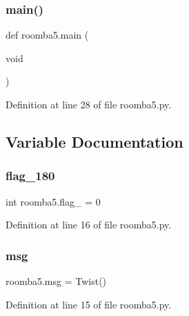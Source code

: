\subsubsection{\texorpdfstring{main()}{main()}}
{\footnotesize\ttfamily def roomba5.\+main (\begin{DoxyParamCaption}\item[{void}]{ }\end{DoxyParamCaption})}



Definition at line 28 of file roomba5.\+py.



\subsection{Variable Documentation}
\mbox{\label{namespaceroomba5_ac8bb0244cccd2213d5c04a634a0760e7}} 
\subsubsection{\texorpdfstring{flag\_180}{flag\_180}}
{\footnotesize\ttfamily int roomba5.\+flag\+\_ = 0}



Definition at line 16 of file roomba5.\+py.

\mbox{\label{namespaceroomba5_abac30f38a065446691c5ab88937ed237}} 
\subsubsection{\texorpdfstring{msg}{msg}}
{\footnotesize\ttfamily roomba5.\+msg = Twist()}



Definition at line 15 of file roomba5.\+py.

